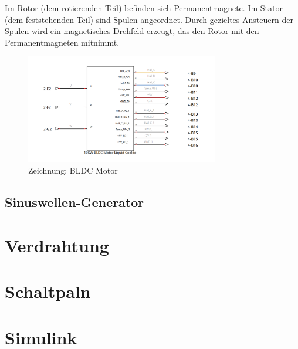 Im Rotor (dem rotierenden Teil) befinden sich Permanentmagnete. Im Stator (dem feststehenden Teil) sind Spulen angeordnet. Durch gezieltes Ansteuern der Spulen wird ein magnetisches Drehfeld erzeugt, das den Rotor mit den Permanentmagneten mitnimmt.


\begin{figure}[!ht]
	\begin{center}
		\includegraphics[width=0.75\textwidth]{img/2_imp/2_circ_bldc_motor.png}
		\caption{Zeichnung: BLDC Motor}
		\label{img_2_2:circ_bldc}
	\end{center}
\end{figure}



\subsection{Sinuswellen-Generator}
\label{Sinuswellen-Generator}





\section{Verdrahtung}

\section{Schaltpaln}

\section{Simulink}

\